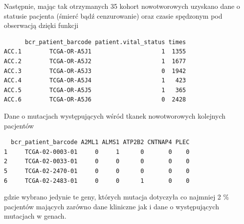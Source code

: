 Następnie, mając tak otrzymanych 35 kohort nowotworowych uzyskano dane o
statusie pacjenta (śmierć bądź cenzurowanie) oraz czasie spędzonym
pod obserwacją dzięki funkcji

\begin{Shaded}
\begin{Highlighting}[]
\NormalTok{(}\StringTok{ }
\end{Highlighting}
\end{Shaded}

\begin{verbatim}
      bcr_patient_barcode patient.vital_status times
ACC.1        TCGA-OR-A5J1                    1  1355
ACC.2        TCGA-OR-A5J2                    1  1677
ACC.3        TCGA-OR-A5J3                    0  1942
ACC.4        TCGA-OR-A5J4                    1   423
ACC.5        TCGA-OR-A5J5                    1   365
ACC.6        TCGA-OR-A5J6                    0  2428
\end{verbatim}

Dane o mutacjach występujących wśród tkanek nowotworowych kolejnych pacjentów 

\begin{Shaded}
\begin{Highlighting}[]
\NormalTok{) ->}\StringTok{ }
\NormalTok{mutationsData[}\NormalTok{(}\NormalTok{,}\NormalTok{,}\NormalTok{,}\NormalTok{)}\NormalTok{, }\NormalTok{(}\NormalTok{,}\NormalTok{,}\NormalTok{,}\NormalTok{,}\NormalTok{,}\NormalTok{)]}
\end{Highlighting}
\end{Shaded}

\begin{verbatim}
  bcr_patient_barcode A2ML1 ALMS1 ATP2B2 CNTNAP4 PLEC
1     TCGA-02-0003-01     0     1      0       0    0
2     TCGA-02-0033-01     0     0      0       0    0
5     TCGA-02-2470-01     0     0      0       0    0
6     TCGA-02-2483-01     0     0      1       0    0
\end{verbatim}

gdzie wybrano jedynie te geny, których mutacja dotyczyła co najmniej 2
\% pacjentów mających zarówno dane kliniczne jak i dane o występujących
mutacjach w genach.

